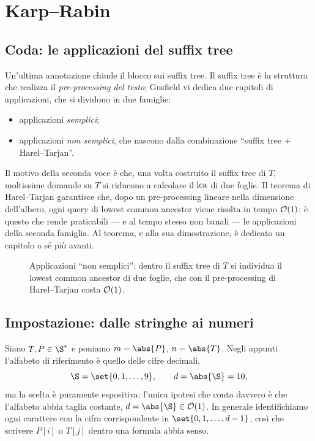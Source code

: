 \chapter{Karp--Rabin}
\label{cap:karp-rabin}

\section{Coda: le applicazioni del suffix tree}

Un'ultima annotazione chiude il blocco sui suffix tree. Il suffix tree è la struttura che
realizza il \emph{pre-processing del testo}; Gusfield vi dedica due capitoli di applicazioni,
che si dividono in due famiglie:
\begin{itemize}
  \item applicazioni \emph{semplici};
  \item applicazioni \emph{non semplici}, che nascono dalla combinazione
        ``suffix tree $+$ Harel--Tarjan''.
\end{itemize}

Il motivo della seconda voce è che, una volta costruito il suffix tree di $T$, moltissime
domande su $T$ si riducono a calcolare il $\operatorname{lca}$ di due foglie. Il teorema di Harel--Tarjan
garantisce che, dopo un pre-processing lineare nella dimensione dell'albero, ogni query di
lowest common ancestor viene risolta in tempo $\mathcal{O}(1)$: è questo che rende praticabili --- e
al tempo stesso non banali --- le applicazioni della seconda famiglia. Al teorema, e alla sua
dimostrazione, è dedicato un capitolo a sé più avanti.

\begin{figure}[H]\centering
\caption{Applicazioni ``non semplici'': dentro il suffix tree di $T$ si individua il lowest
common ancestor di due foglie, che con il pre-processing di Harel--Tarjan costa $\mathcal{O}(1)$.}
\label{fig:stree-lca-montagna}
\end{figure}

\section{Impostazione: dalle stringhe ai numeri}

Siano $T,P \in \S^{*}$ e poniamo $m = \abs{P}$, $n = \abs{T}$. Negli appunti l'alfabeto di
riferimento è quello delle cifre decimali,
\[
  \S = \set{0,1,\dots,9}, \qquad d = \abs{\S} = 10,
\]
ma la scelta è puramente espositiva: l'unica ipotesi che conta davvero è che l'alfabeto abbia
taglia costante, $d = \abs{\S} \in \Oh(1)$. In generale identifichiamo ogni carattere con la
cifra corrispondente in $\set{0,1,\dots,d-1}$, così che scrivere $P[i]$ o $T[j]$ dentro una
formula abbia senso.

